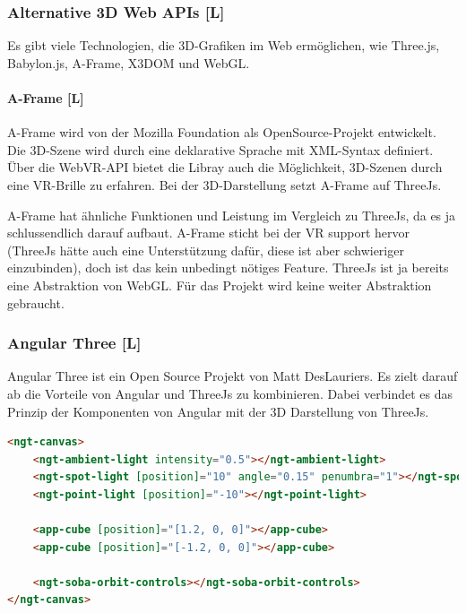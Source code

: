 \subsubsection{Alternative 3D Web APIs [L]}
Es gibt viele Technologien, die 3D-Grafiken im Web ermöglichen, wie Three.js, Babylon.js, A-Frame, X3DOM und WebGL.

\paragraph{A-Frame [L]}
A-Frame wird von der Mozilla Foundation als OpenSource-Projekt entwickelt. Die 3D-Szene wird durch eine deklarative Sprache mit XML-Syntax definiert. Über die WebVR-API bietet die Libray auch die Möglichkeit, 3D-Szenen durch eine VR-Brille zu erfahren. Bei der 3D-Darstellung setzt A-Frame auf ThreeJs. \cite[A-Frame Wikipedia]{a-frame-wiki}

A-Frame hat ähnliche Funktionen und Leistung im Vergleich zu ThreeJs, da es ja schlussendlich darauf aufbaut. A-Frame sticht bei der VR support hervor (ThreeJs hätte auch eine Unterstützung dafür, diese ist aber schwieriger einzubinden), doch ist das kein unbedingt nötiges Feature. ThreeJs ist ja bereits eine Abstraktion von WebGL. Für das Projekt wird keine weiter Abstraktion gebraucht.

\subsubsection{Angular Three [L]}
\label{ch:Technologien:AngularThree}
Angular Three ist ein Open Source Projekt von Matt DesLauriers. Es zielt darauf ab die Vorteile von Angular und ThreeJs zu kombinieren. Dabei verbindet es das Prinzip der Komponenten von Angular mit der 3D Darstellung von ThreeJs. 

\begin{lstlisting}[language=html,caption=Angular Three - Komponentenbasiertes 3D Scenen in HTML,label=lst:impl:AngularThreeExampleCode]
<ngt-canvas>
    <ngt-ambient-light intensity="0.5"></ngt-ambient-light>
    <ngt-spot-light [position]="10" angle="0.15" penumbra="1"></ngt-spot-light>
    <ngt-point-light [position]="-10"></ngt-point-light>
  
    <app-cube [position]="[1.2, 0, 0]"></app-cube>
    <app-cube [position]="[-1.2, 0, 0]"></app-cube>
  
    <ngt-soba-orbit-controls></ngt-soba-orbit-controls>
</ngt-canvas>
\end{lstlisting}

